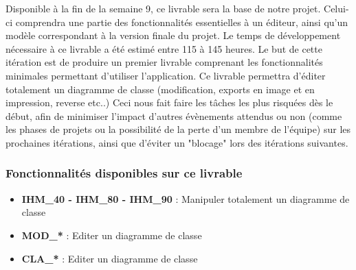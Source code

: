 \documentclass[hidelinks, 10pt,a4paper]{article}
\begin{document}
Disponible à la fin de la semaine 9, ce livrable sera la base de notre projet. 
Celui-ci comprendra une partie des fonctionnalités essentielles à un éditeur, ainsi 
qu'un modèle correspondant à la version finale du projet.
Le temps de développement nécessaire à ce livrable a été estimé entre 115 à 145 heures.
Le but de cette itération est de produire un premier livrable comprenant les fonctionnalités
minimales permettant d'utiliser l'application. Ce livrable permettra d'éditer totalement un diagramme de classe
(modification, exports en image et en impression, reverse etc..)
Ceci nous fait faire les tâches les plus risquées dès le début, afin de minimiser
l'impact d'autres évènements attendus ou non (comme les phases de projets ou la possibilité de la perte
d'un membre de l'équipe) sur les prochaines itérations, ainsi que d'éviter un "blocage" lors des itérations
suivantes.

\subsubsection{Fonctionnalités disponibles sur ce livrable}
\begin{itemize}
\item \textbf{IHM\_40 - IHM\_80 - IHM\_90} : Manipuler totalement un diagramme de classe
\item \textbf{MOD\_*} : Editer un diagramme de classe
 \item \textbf{CLA\_*} : Editer un diagramme de classe
\end{itemize}
\end{document}
